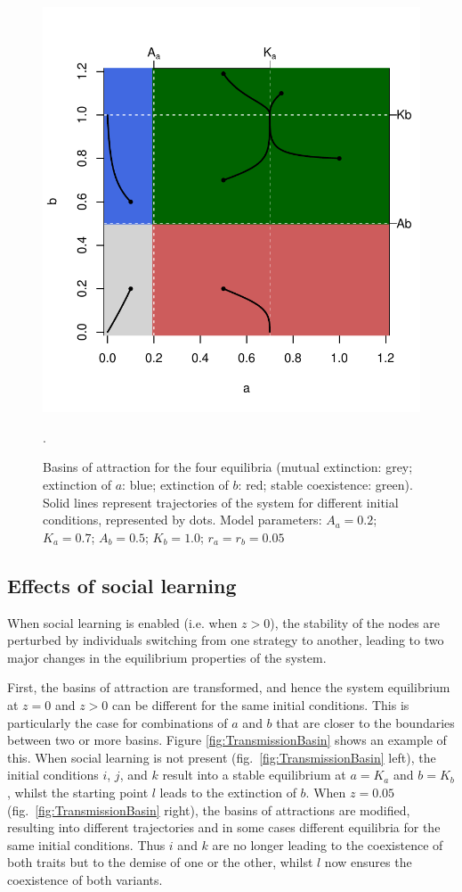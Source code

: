 \documentclass[review,authoryear]{elsarticle}
\begin{document}
\begin{figure}[h!]
  \centering
      \includegraphics[width=1\textwidth]{./figures/figure2.pdf}
  \caption{Basins of attraction for the four equilibria (mutual extinction: grey; extinction of $a$: blue; extinction of $b$: red; stable coexistence: green). Solid lines represent trajectories of the system for different initial conditions, represented by dots. Model parameters: $A_a=0.2$; $K_a=0.7$; $A_b=0.5$; $K_b=1.0$; $r_a=r_b=0.05$}.
    \label{fig:NoTransmissionBasin}
\end{figure}

\subsection{Effects of social learning}

When social learning is enabled (i.e. when $z>0$), the stability of the nodes are perturbed by individuals switching from one strategy to another, leading to two major changes in the equilibrium properties of the system. 

First, the basins of attraction are transformed, and hence the system equilibrium at $z=0$ and $z>0$ can be different for the same initial conditions. This is particularly the case for combinations of $a$ and $b$ that are closer to the boundaries between two or more basins.  Figure \ref{fig:TransmissionBasin} shows an example of this. When social learning is not present (fig.~\ref{fig:TransmissionBasin} left), the initial conditions $i$, $j$, and $k$ result into a stable equilibrium at $a=K_a$ and $b=K_b$, whilst the starting point $l$ leads to the extinction of $b$. When $z=0.05$ (fig.~\ref{fig:TransmissionBasin} right), the basins of attractions are modified, resulting into different trajectories and in some cases different equilibria for the same initial conditions. Thus $i$ and $k$ are no longer leading to the coexistence of both traits but to the demise of one or the other, whilst $l$ now ensures the coexistence of both variants. 
\end{document}
